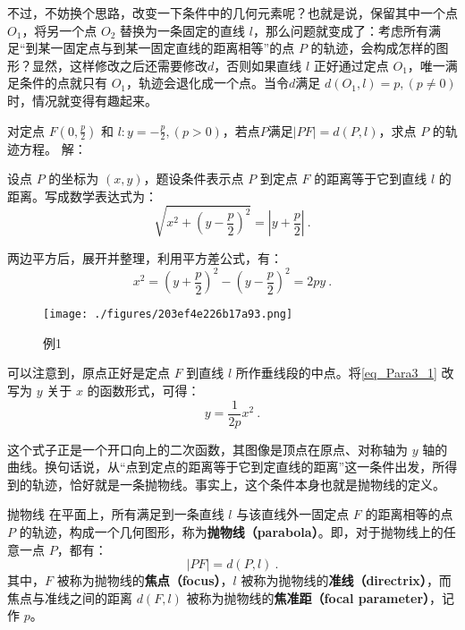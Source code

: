不过，不妨换个思路，改变一下条件中的几何元素呢？也就是说，保留其中一个点 $O_1$，将另一个点 $O_2$ 替换为一条固定的直线 $l$，那么问题就变成了：考虑所有满足“到某一固定点与到某一固定直线的距离相等”的点 $P$ 的轨迹，会构成怎样的图形？显然，这样修改之后还需要修改$d$，否则如果直线 $l$ 正好通过定点 $O_1$，唯一满足条件的点就只有 $O_1$，轨迹会退化成一个点。当令$d$满足 $d(O_1,l)=p,(p\neq0)$时，情况就变得有趣起来。

\begin{example}{对定点 $F\left(0, \displaystyle\frac{p}{2}\right)$ 和 $l:y=-\displaystyle\frac{p}{2},\left(p>0\right)$，若点$P$满足$|PF|=d(P,l)$，求点 $P$ 的轨迹方程。}\label{ex_Para3_1}
解：

设点 $P$ 的坐标为 $(x, y)$，题设条件表示点 $P$ 到定点 $F$ 的距离等于它到直线 $l$ 的距离。写成数学表达式为：
\begin{equation}
\sqrt{x^2 + \left(y - \frac{p}{2}\right)^2} = |y + \frac{p}{2}|~.
\end{equation}

两边平方后，展开并整理，利用平方差公式，有：
\begin{equation}\label{eq_Para3_1}
x^2 = \left(y + \frac{p}{2}\right)^2 - \left(y - \frac{p}{2}\right)^2 = 2py~.
\end{equation}
\begin{figure}[ht]
\centering
\texttt{[image: ./figures/203ef4e226b17a93.png]}
\caption{例1} \label{fig_Para3_5}
\end{figure}
\end{example}


可以注意到，原点正好是定点 $F$ 到直线 $l$ 所作垂线段的中点。将\autoref{eq_Para3_1} 改写为 $y$ 关于 $x$ 的函数形式，可得：
\begin{equation}\label{eq_Para3_2}
y = \frac{1}{2p}x^2~.
\end{equation}

这个式子正是一个开口向上的二次函数，其图像是顶点在原点、对称轴为 $y$ 轴的曲线。换句话说，从“点到定点的距离等于它到定直线的距离”这一条件出发，所得到的轨迹，恰好就是一条抛物线。事实上，这个条件本身也就是抛物线的定义。

\begin{definition}{抛物线}
在平面上，所有满足到一条直线 $l$ 与该直线外一固定点 $F$ 的距离相等的点 $P$ 的轨迹，构成一个几何图形，称为\textbf{抛物线（parabola）}。即，对于抛物线上的任意一点 $P$，都有：
\begin{equation}
|PF| = d(P, l)~.
\end{equation}
其中，$F$ 被称为抛物线的\textbf{焦点（focus）}，$l$ 被称为抛物线的\textbf{准线（directrix）}，而焦点与准线之间的距离 $d(F, l)$ 被称为抛物线的\textbf{焦准距（focal parameter）}，记作 $p$。
\end{definition}

